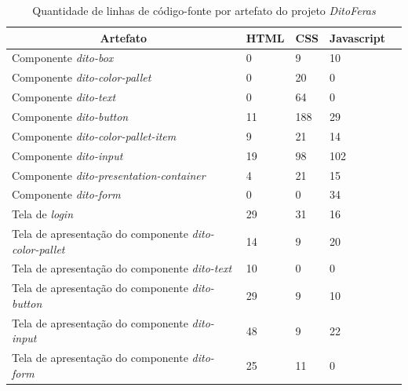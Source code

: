 \begin{table}
\centering
\begin{tabular}{|m{10cm}|m{1cm}|m{1cm}|m{1cm}|m{1cm}|} \hline
	
	\multicolumn{1}{|c|}{\bfseries Artefato} & \multicolumn{1}{c|}{\bfseries HTML} & \multicolumn{1}{c|}{\bfseries CSS} & \multicolumn{1}{c|}{\bfseries Javascript} \\\hline
	
	 Componente \textit{dito-box} & 0 & 9 & 10 \\\hline
	 Componente \textit{dito-color-pallet} & 0 & 20 & 0 \\\hline
	 Componente \textit{dito-text} & 0 & 64 & 0 \\\hline
	 
	 Componente \textit{dito-button} & 11 & 188 & 29 \\\hline
	 Componente \textit{dito-color-pallet-item} & 9 & 21 & 14 \\\hline
	 Componente \textit{dito-input} & 19 & 98 & 102 \\\hline
	 Componente \textit{dito-presentation-container} & 4 & 21 & 15 \\\hline
	 
	 Componente \textit{dito-form} & 0 & 0 & 34 \\\hline
	 
	 Tela de \textit{login} & 29 & 31 & 16 \\\hline
	 Tela de apresentação do componente \textit{dito-color-pallet} & 14 & 9 & 20 \\\hline
	 Tela de apresentação do componente \textit{dito-text} & 10 & 0 & 0 \\\hline
	 Tela de apresentação do componente \textit{dito-button} & 29 & 9 & 10 \\\hline
	 Tela de apresentação do componente \textit{dito-input} & 48 & 9 & 22 \\\hline
	 Tela de apresentação do componente \textit{dito-form} & 25 & 11 & 0 \\\hline
    
\end{tabular}
\caption{Quantidade de linhas de código-fonte por artefato do projeto \textit{DitoFeras}}
\label{table:lineCountDitoFeras}
\end{table}


